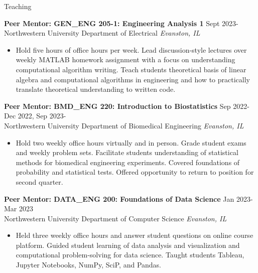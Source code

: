\documentclass{resume} %
\begin{document}

\begin{rSection}{Teaching}

\textbf{Peer Mentor: GEN\_ENG 205-1: Engineering Analysis 1} \hfill Sept 2023-\\
Northwestern University Department of Electrical \hfill \textit{Evanston, IL}
 \begin{itemize}
    \itemsep -3pt {}
        \item[] Hold five hours of office hours per week.
        Lead discussion-style lectures over weekly MATLAB homework assignment with a focus on understanding computational algorithm writing.
        Teach students theoretical basis of linear algebra and computational algorithms in engineering and how to practically translate theoretical understanding to written code.
 \end{itemize}
 
\textbf{Peer Mentor: BMD\_ENG 220: Introduction to Biostatistics} \hfill Sep 2022-Dec 2022, Sep 2023-\\
Northwestern University Department of Biomedical Engineering \hfill \textit{Evanston, IL}
 \begin{itemize}
    \itemsep -3pt {} 
    \item[] Hold two weekly office hours virtually and in person.
    Grade student exams and weekly problem sets.
    Facilitate students understanding of statistical methods for biomedical engineering experiments.
    Covered foundations of probability and statistical tests.
    Offered opportunity to return to position for second quarter.
 \end{itemize}

\textbf{Peer Mentor: DATA\_ENG 200: Foundations of Data Science} \hfill Jan 2023-Mar 2023\\
Northwestern University Department of Computer Science \hfill \textit{Evanston, IL}
 \begin{itemize}
    \itemsep -3pt {}
        \item[] Held three weekly office hours and answer student questions on online course platform.
        Guided student learning of data analysis and visualization and computational problem-solving for data science.
        Taught students Tableau, Jupyter Notebooks, NumPy, SciP, and Pandas.
 \end{itemize}

\end{rSection} 
\end{document}
